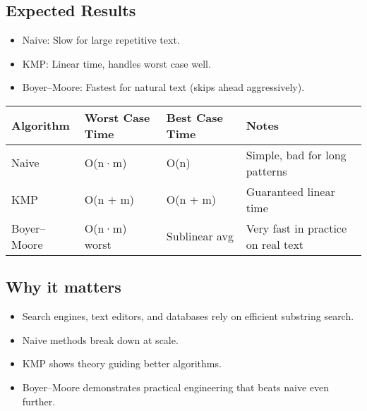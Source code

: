 \documentclass[
  letterpaper,
  DIV=11,
  numbers=noendperiod]{scrreprt}
\providecommand{\tightlist}{%
  \setlength{\itemsep}{0pt}\setlength{\parskip}{0pt}}
\begin{document}
\subsection{Expected Results}\label{expected-results-9}

\begin{itemize}
\tightlist
\item
  Naive: Slow for large repetitive text.
\item
  KMP: Linear time, handles worst case well.
\item
  Boyer--Moore: Fastest for natural text (skips ahead aggressively).
\end{itemize}

\begin{longtable}[]{@{}
  >{\raggedright\arraybackslash}p{}
  >{\raggedright\arraybackslash}p{}
  >{\raggedright\arraybackslash}p{}
  >{\raggedright\arraybackslash}p{}@{}}
\toprule\noalign{}
\begin{minipage}[b]{\linewidth}\raggedright
Algorithm
\end{minipage} & \begin{minipage}[b]{\linewidth}\raggedright
Worst Case Time
\end{minipage} & \begin{minipage}[b]{\linewidth}\raggedright
Best Case Time
\end{minipage} & \begin{minipage}[b]{\linewidth}\raggedright
Notes
\end{minipage} \\
\midrule\noalign{}
\endhead
\bottomrule\noalign{}
\endlastfoot
Naive & O(n·m) & O(n) & Simple, bad for long patterns \\
KMP & O(n + m) & O(n + m) & Guaranteed linear time \\
Boyer--Moore & O(n·m) worst & Sublinear avg & Very fast in practice on
real text \\
\end{longtable}

\subsection{Why it matters}\label{why-it-matters-54}

\begin{itemize}
\tightlist
\item
  Search engines, text editors, and databases rely on efficient
  substring search.
\item
  Naive methods break down at scale.
\item
  KMP shows theory guiding better algorithms.
\item
  Boyer--Moore demonstrates practical engineering that beats naive even
  further.
\end{itemize}
\end{document}
